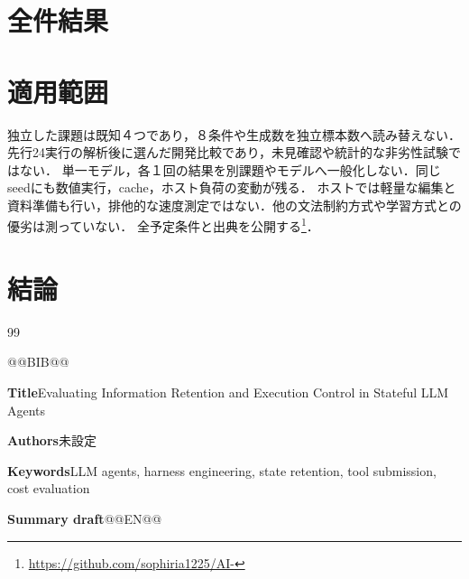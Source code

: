\documentclass[uplatex,a4paper,twocolumn,10pt]{jsarticle}
\begin{document}
\section{全件結果}




\section{適用範囲}
独立した課題は既知４つであり，８条件や生成数を独立標本数へ読み替えない．
先行24実行の解析後に選んだ開発比較であり，未見確認や統計的な非劣性試験ではない．
単一モデル，各１回の結果を別課題やモデルへ一般化しない．同じseedにも数値実行，cache，ホスト負荷の変動が残る．
ホストでは軽量な編集と資料準備も行い，排他的な速度測定ではない．他の文法制約方式や学習方式との優劣は測っていない．
全予定条件と出典を公開する\footnote{\url{https://github.com/sophiria1225/AI-}}．

\section{結論}

\begin{thebibliography}{99}
\small\raggedright
@@BIB@@
\end{thebibliography}
\clearpage
\onecolumn
\noindent\textbf{Title}\quad Evaluating Information Retention and Execution Control in Stateful LLM Agents

\noindent\textbf{Authors}\quad 未設定

\noindent\textbf{Keywords}\quad LLM agents, harness engineering, state retention, tool submission, cost evaluation

\noindent\textbf{Summary draft}\quad @@EN@@
\end{document}
